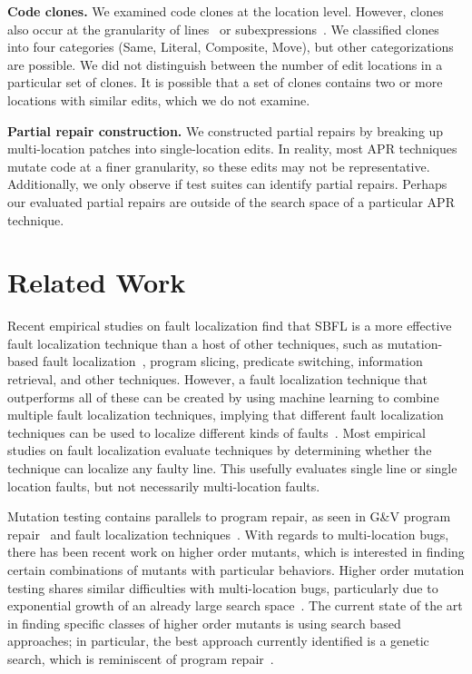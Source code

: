 \documentclass[10pt, conference]{IEEEtran}
\begin{document}
\vspace{1ex}
\noindent\textbf{Code clones.}
We examined code clones at the location level.  However, clones also occur at the
granularity of lines~\cite{JiaClones} or
subexpressions~\cite{microclones}. We classified clones into four
categories (Same, Literal, Composite, Move), but other categorizations 
are possible.
%
We did not distinguish between the number
of edit locations in a particular set of clones. It is possible that a set of
clones contains two or more locations with similar edits, which we do not examine. 

\vspace{1ex}
\noindent\textbf{Partial repair construction.}
We constructed partial repairs by breaking up multi-location patches
into single-location edits.
In reality, most APR techniques mutate code at a finer granularity, so
these edits may not be representative.  Additionally, we only observe if test suites
can identify partial repairs. Perhaps our evaluated partial repairs
are outside of the search space of a
particular APR technique.

\section{Related Work}
\label{sec:related}

Recent empirical studies on fault localization find that 
SBFL is a more effective fault localization technique than a host of other techniques, such as 
mutation-based fault localization~\cite{pearson2017evaluating, mut-analysis}, program 
slicing, predicate switching,  information retrieval, and other techniques. 
However, a fault localization 
technique that outperforms all of these can be created by using machine learning to combine 
multiple fault localization techniques, implying that different fault localization techniques can 
be used to localize different kinds of faults~\cite{zou2019empirical}. Most empirical 
studies on fault localization evaluate techniques by determining whether the 
technique can localize any faulty line. This usefully evaluates single line or single 
location faults, but not necessarily multi-location faults.

Mutation testing contains parallels to program repair, as seen in G\&V
program repair~\cite{weimer2013leveraging} and fault 
localization techniques~\cite{metallaxis,muse,mbfl-survey}. With regards to multi-location 
bugs, there has been recent work on higher order mutants, which is interested in finding 
certain combinations of mutants with particular behaviors. Higher order mutation testing 
shares similar difficulties with multi-location bugs, particularly due to exponential growth of 
an already large search 
space~\cite{long-search-spaces}. The current state of the art in finding specific classes of 
higher order mutants is using search based approaches; in particular, the best approach 
currently identified is a genetic search, which is reminiscent of program repair~\cite{homs, 
genprog}.
\end{document}
